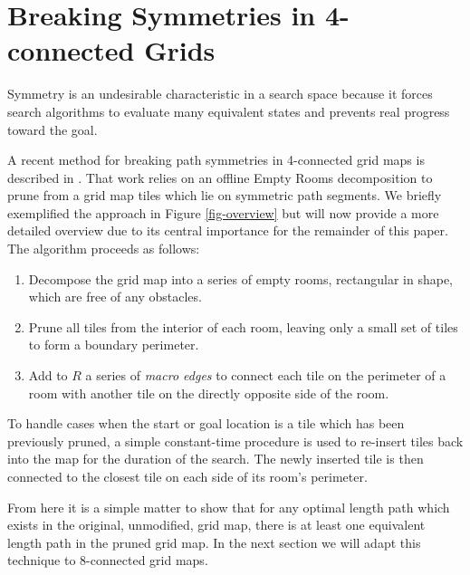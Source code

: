 \section{Breaking Symmetries in 4-connected Grids}
Symmetry is an undesirable characteristic in a search space because it forces
search algorithms to evaluate many equivalent states and prevents real progress toward the goal.
\par
A recent method for breaking path symmetries in 4-connected grid maps is described in \cite{harabor10}.
That work relies on an offline Empty Rooms decomposition to prune from a grid map tiles which lie on 
symmetric path segments.
We briefly exemplified the approach in Figure \ref{fig-overview} but will now provide a more detailed overview
due to its central importance for the remainder of this paper.
The algorithm proceeds as follows:
\begin{enumerate}
\item{Decompose the grid map into a series of empty rooms, rectangular in shape, which are free of any obstacles.}
\item{Prune all tiles from the interior of each room, leaving only a small set of tiles to form a boundary perimeter.} 
\item{Add to $R$ a series of \emph{macro edges} to connect each tile on the perimeter of a room with another tile on the directly opposite side
of the room. }
\end{enumerate}
To handle cases when the start or goal location is a tile which has been previously pruned, a simple constant-time
procedure is used to re-insert tiles back into the map for the duration of the search.
The newly inserted tile is then connected to the closest tile on each side of its room's perimeter.

From here it is a simple matter to show that for any optimal length path which exists in the original, unmodified, grid
map, there is at least one equivalent length path in the pruned grid map. 
In the next section we will adapt this technique to 8-connected grid maps. 
